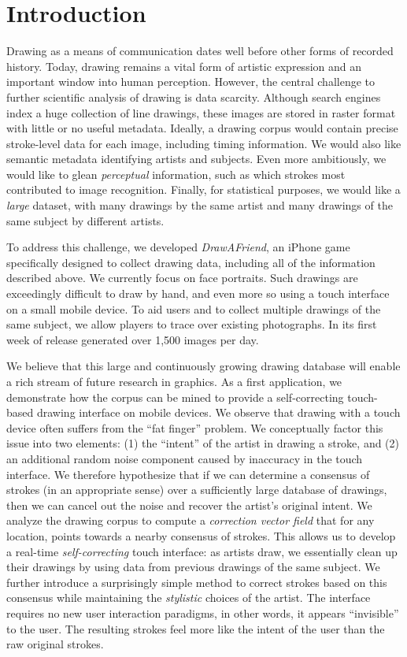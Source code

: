 \section{Introduction}

Drawing as a means of communication dates well before other forms of
recorded history. Today, drawing remains a vital form of artistic
expression and an important window into human perception. However,
the central challenge to further scientific analysis of drawing is
data scarcity. Although search engines index a huge collection of
line drawings, these images are stored in raster format with little
or no useful metadata. Ideally, a drawing corpus would contain
precise stroke-level data for each image, including timing
information. We would also like semantic metadata identifying
artists and subjects. Even more ambitiously, we would like to glean
\emph{perceptual} information, such as which strokes most
contributed to image recognition. Finally, for statistical purposes,
we would like a \emph{large} dataset, with many drawings by the same
artist and many drawings of the same subject by different artists.

To address this challenge, we developed \emph{DrawAFriend}, an
iPhone game specifically designed to collect drawing data, including
all of the information described above. We currently focus on face
portraits. Such drawings are exceedingly difficult to draw by hand,
and even more so using a touch interface on a small mobile device.
To aid users and to collect multiple drawings of the same subject,
we allow players to trace over existing photographs. In its first
week of release \daf generated over 1,500 images per day.

We believe that this large and continuously growing drawing database
will enable a rich stream of future research in graphics. As a first
application, we demonstrate how the \daf corpus can be mined to
provide a self-correcting touch-based drawing interface on mobile
devices. We observe that drawing with a touch device often suffers
from the ``fat finger'' problem. We conceptually factor this issue
into two elements: (1) the ``intent'' of the artist in drawing a
stroke, and (2) an additional random noise component caused by
inaccuracy in the touch interface. We therefore hypothesize that if
we can determine a consensus of strokes (in an appropriate sense)
over a sufficiently large database of drawings, then we can cancel
out the noise and recover the artist's original intent. We analyze
the drawing corpus to compute a \emph{correction vector field} that
for any location, points towards a nearby consensus of strokes. This
allows us to develop a real-time {\em self-correcting} touch
interface: as artists draw, we essentially clean up their drawings by using data from previous drawings of the same subject. We
further introduce a surprisingly simple method to correct strokes
based on this consensus while maintaining the {\em stylistic}
choices of the artist. The interface requires no new user
interaction paradigms, in other words, it appears ``invisible'' to
the user. The resulting strokes feel more like the intent of the
user than the raw original strokes.

